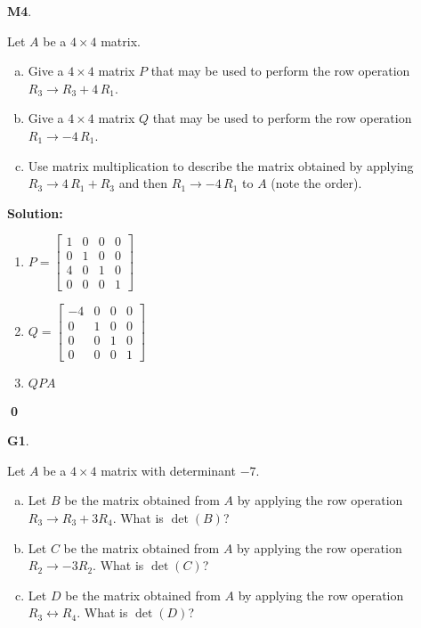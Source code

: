 \documentclass{article}
\newenvironment{problem}[1]
{
  \begin{flushleft}
  \textbf{#1}.
  \ignorespaces
}
{
  \end{flushleft}
}
\newenvironment{solution}
{
  \ignorespaces
  \textbf{Solution:}
}
{
  \ignorespacesafterend
  \begin{flushright}
  {\bfseries \qed}
  \end{flushright}
}
\begin{document}
\begin{problem}{M4}
Let \(A\) be a \(4\times4\) matrix.
\begin{enumerate}[(a)]
\item Give a \(4\times 4\) matrix \(P\) that may be used to perform the row
      operation \({R_3} \to R_3+4 \, {R_1} \).
\item Give a \(4\times 4\) matrix \(Q\) that may be used to perform the row
      operation \({R_1} \to -4 \, {R_1}\).
\item Use matrix multiplication to describe the matrix obtained by applying 
        \({R_3} \to 4 \, {R_1} + {R_3}\) and then \({R_1} \to -4 \, {R_1}\)
      to \(A\) (note the order).
\end{enumerate}
\end{problem}
\begin{solution}
\begin{enumerate}
\item 
\(P=\begin{bmatrix} 1 & 0 & 0 & 0\\ 0 & 1 & 0 & 0 \\ 4 & 0 & 1 & 0 \\ 0 & 0 & 0 & 1 \end{bmatrix}\)
\item
\(Q=\begin{bmatrix} -4 & 0 & 0 & 0 \\ 0 & 1 & 0 & 0\\ 0 & 0 & 1 & 0 \\ 0 & 0 & 0 & 1\end{bmatrix}\)
\item \( QPA\)
\end{enumerate}
\end{solution}

\begin{problem}{G1}
Let \(A\) be a \(4 \times 4\) matrix with determinant \(-7\).
\begin{enumerate}[(a)]
\item Let \(B\) be the matrix obtained from \(A\) by applying the row operation \(R_3 \to R_3+3R_4\). What is \(\det(B)\)?
\item Let \(C\) be the matrix obtained from \(A\) by applying the row operation \(R_2 \to -3R_2\). What is \(\det(C)\)?
\item Let \(D\) be the matrix obtained from \(A\) by applying the row operation \(R_3 \leftrightarrow R_4\). What is \(\det(D)\)?
\end{enumerate}
\end{problem}
\end{document}
